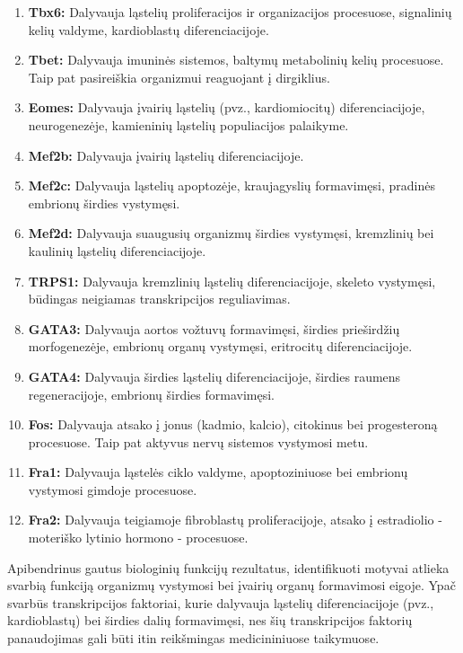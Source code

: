\documentclass[12pt]{article}
\begin{document}
\begin{enumerate}
    \item \textbf{Tbx6:} Dalyvauja ląstelių proliferacijos ir organizacijos
        procesuose, signalinių kelių valdyme, kardioblastų diferenciacijoje.
    \item \textbf{Tbet:} Dalyvauja imuninės sistemos, baltymų metabolinių
        kelių procesuose. Taip pat pasireiškia organizmui reaguojant į
        dirgiklius.
    \item \textbf{Eomes:} Dalyvauja įvairių ląstelių (pvz.,
        kardiomiocitų) diferenciacijoje, neurogenezėje, kamieninių ląstelių
        populiacijos palaikyme.
    \item \textbf{Mef2b:} Dalyvauja įvairių ląstelių diferenciacijoje.
    \item \textbf{Mef2c:} Dalyvauja ląstelių apoptozėje, kraujagyslių
        formavimęsi, pradinės embrionų širdies vystymęsi.
    \item \textbf{Mef2d:} Dalyvauja suaugusių organizmų širdies vystymęsi,
        kremzlinių bei kaulinių ląstelių diferenciacijoje.
    \item \textbf{TRPS1:} Dalyvauja kremzlinių ląstelių diferenciacijoje,
        skeleto vystymęsi, būdingas neigiamas transkripcijos reguliavimas.
    \item \textbf{GATA3:} Dalyvauja aortos vožtuvų formavimęsi, širdies
        prieširdžių morfogenezėje, embrionų organų vystymęsi, eritrocitų
        diferenciacijoje.
    \item \textbf{GATA4:} Dalyvauja širdies ląstelių diferenciacijoje,
        širdies raumens regeneracijoje, embrionų širdies formavimęsi.
    \item \textbf{Fos:} Dalyvauja atsako į jonus (kadmio, kalcio),
        citokinus bei progesteroną procesuose. Taip pat aktyvus nervų sistemos
        vystymosi metu.
    \item \textbf{Fra1:} Dalyvauja ląstelės ciklo valdyme, apoptoziniuose
        bei embrionų vystymosi gimdoje procesuose.
    \item \textbf{Fra2:} Dalyvauja teigiamoje fibroblastų proliferacijoje,
        atsako į estradiolio - moteriško lytinio hormono - procesuose.
\end{enumerate}

Apibendrinus gautus biologinių funkcijų rezultatus, identifikuoti motyvai
atlieka svarbią funkciją organizmų vystymosi bei įvairių organų formavimosi
eigoje. Ypač svarbūs transkripcijos faktoriai, kurie dalyvauja ląstelių
diferenciacijoje (pvz., kardioblastų) bei širdies dalių formavimęsi, nes šių
transkripcijos faktorių panaudojimas gali būti itin reikšmingas
medicininiuose taikymuose.
\end{document}
